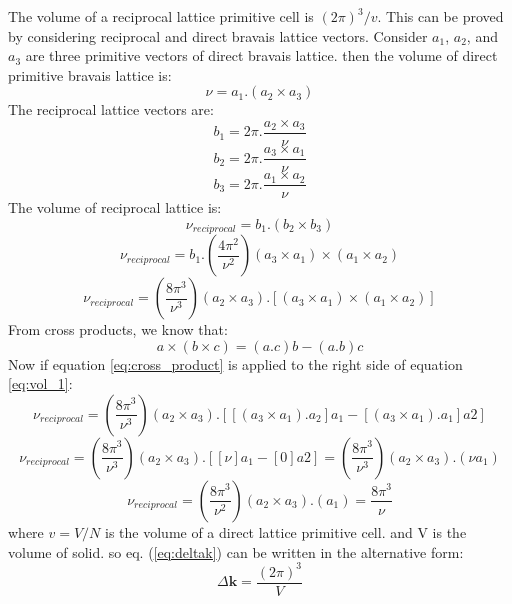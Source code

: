 	The volume of a reciprocal lattice primitive cell is $(2π)^3/v$. This can be proved by considering reciprocal and direct bravais lattice vectors.
	Consider $a_{1}$, $a_{2}$, and $a_{3}$  are three primitive vectors of direct bravais lattice. then the volume of direct primitive bravais lattice is:
	\begin{equation*}
		\nu = a_{1}.(a_{2}\times a_{3})
	\end{equation*}
	The reciprocal lattice vectors are:
	\begin{equation*}
		b_{1} = 2\pi.\frac{a_{2}\times a_{3}}{\nu}
	\end{equation*}
	\begin{equation*}
		b_{2} = 2\pi.\frac{a_{3}\times a_{1}}{\nu}
	\end{equation*}
	\begin{equation*}
		b_{3} = 2\pi.\frac{a_{1}\times a_{2}}{\nu}
	\end{equation*}
	The volume of reciprocal lattice is:
	\begin{equation*}
		\nu_{reciprocal} = b_{1}.(b_{2}\times b_{3})
	\end{equation*}
	\begin{equation*}
		\nu_{reciprocal} = b_{1}.(\frac{4\pi^2}{\nu^2})(a_{3}\times a_{1})\times(a_{1}\times a_{2})
	\end{equation*}
	\begin{equation}\label{eq:vol_1}
		\nu_{reciprocal} = (\frac{8\pi^3}{\nu^3})(a_{2}\times a_{3}).[(a_{3}\times a_{1})\times(a_{1}\times a_{2})]
	\end{equation}
	From cross products, we know that:
	\begin{equation}\label{eq:cross_product}
		a\times(b\times c) = (a.c)b - (a.b)c
	\end{equation}
	Now if equation \ref{eq:cross_product} is applied to the right side of equation \ref{eq:vol_1}:
	\begin{equation*}
		\nu_{reciprocal} = (\frac{8\pi^3}{\nu^3})(a_{2}\times a_{3}).[[(a_{3}\times a_{1}).a_{2}]a_{1}-[(a_{3}\times a_{1}).a_{1}]a{2}] 
	\end{equation*}
	\begin{equation*}
		\nu_{reciprocal} = (\frac{8\pi^3}{\nu^3})(a_{2}\times a_{3}).[[\nu]a_{1}-[0]a{2}]=  (\frac{8\pi^3}{\nu^3})(a_{2}\times a_{3}).(\nu a_{1})
	\end{equation*}
	\begin{equation*}
		\nu_{reciprocal} =  (\frac{8\pi^3}{\nu^2})(a_{2}\times a_{3}).(a_{1}) = \frac{8\pi^3}{\nu} 
	\end{equation*}
    where $v=V/N$ is the volume of a direct lattice primitive cell. and V is the volume of solid.
	so eq. (\ref{eq:deltak}) can be written in the alternative form:
	\begin{equation} \label{eq:freedeltak}
		\Delta \mathbf{k}
		=
		\frac{(2 \pi)^3}{V}
	\end{equation}

